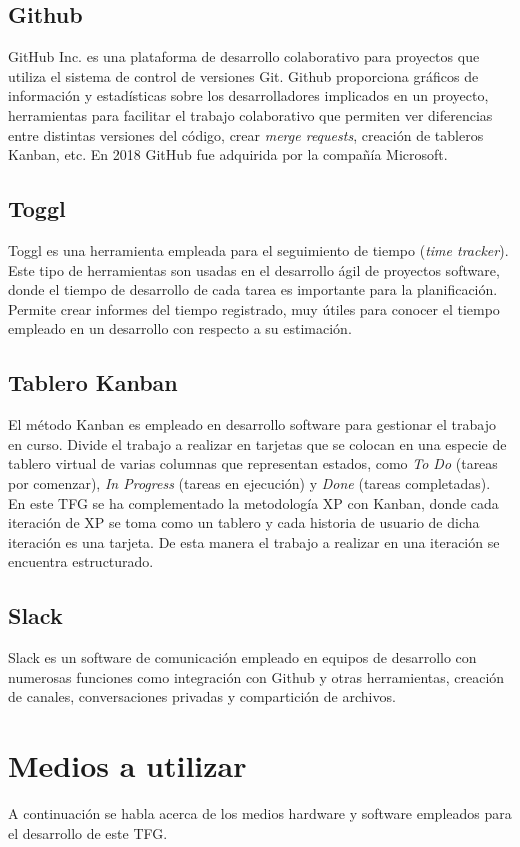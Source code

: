 \subsection{Github}
GitHub Inc. es una plataforma de desarrollo colaborativo para proyectos que utiliza el sistema de control de versiones Git. Github proporciona gráficos de información y estadísticas sobre los desarrolladores implicados en un proyecto, herramientas para facilitar el trabajo colaborativo que permiten ver diferencias entre distintas versiones del código, crear \textit{merge requests}, creación de tableros Kanban, etc. En 2018 GitHub fue adquirida por la compañía Microsoft.
\subsection{Toggl}
Toggl es una herramienta empleada para el seguimiento de tiempo (\textit{time tracker}). Este tipo de herramientas son usadas en el desarrollo ágil de proyectos software, donde el tiempo de desarrollo de cada tarea es importante para la planificación. Permite crear informes del tiempo registrado, muy útiles para conocer el tiempo empleado en un desarrollo con respecto a su estimación.
\subsection{Tablero Kanban}
El método Kanban es empleado en desarrollo software para gestionar el trabajo en curso. Divide el trabajo a realizar en tarjetas que se colocan en una especie de tablero virtual de varias columnas que representan estados, como \textit{To Do} (tareas por comenzar), \textit{In Progress} (tareas en ejecución) y \textit{Done} (tareas completadas). En este \gls{TFG} se ha complementado la metodología \gls{XP} con Kanban, donde cada iteración de \gls{XP} se toma como un tablero y cada historia de usuario de dicha iteración es una tarjeta. De esta manera el trabajo a realizar en una iteración se encuentra estructurado.
\subsection{Slack}
Slack es un software de comunicación empleado en equipos de desarrollo con numerosas funciones como integración con Github y otras herramientas, creación de canales, conversaciones privadas y compartición de archivos.
\section{Medios a utilizar}
A continuación se habla acerca de los medios hardware y software empleados para el desarrollo de este \gls{TFG}.
